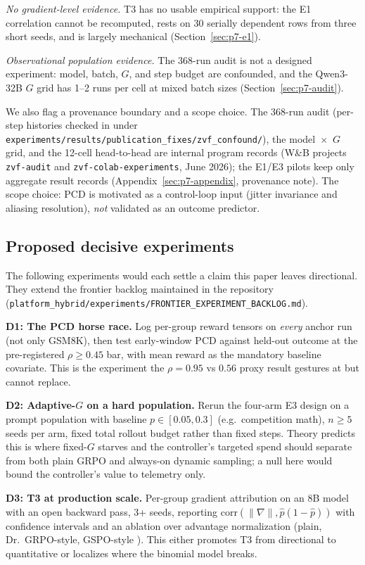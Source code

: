 \emph{No gradient-level evidence.} T3 has no usable empirical support: the
E1 correlation cannot be recomputed, rests on 30 serially dependent rows from
three short seeds, and is largely mechanical (Section~\ref{sec:p7-e1}).

\emph{Observational population evidence.} The 368-run audit is not a designed
experiment: model, batch, $G$, and step budget are confounded, and the
Qwen3-32B $G$ grid has 1--2 runs per cell at mixed batch sizes
(Section~\ref{sec:p7-audit}).

We also flag a provenance boundary and a scope choice. The 368-run audit
(per-step histories checked in under
\texttt{experiments/results/publication\_fixes/zvf\_confound/}), the
model~$\times$~$G$ grid, and the 12-cell head-to-head are internal program
records (W\&B projects \texttt{zvf-audit} and
\texttt{zvf-colab-experiments}, June 2026); the E1/E3 pilots keep
only aggregate result records (Appendix~\ref{sec:p7-appendix}, provenance
note). The scope choice: PCD is motivated as a control-loop input (jitter
invariance and aliasing resolution), \emph{not} validated as an outcome
predictor.

\subsection{Proposed decisive experiments}
\label{sec:p7-proposed}
The following experiments would each settle a claim this paper leaves
directional. They extend the frontier backlog maintained in the repository
(\texttt{platform_hybrid/experiments/FRONTIER\_EXPERIMENT\_BACKLOG.md}).

\textbf{D1: The PCD horse race.} Log per-group reward tensors on
\emph{every} anchor run (not only GSM8K), then test early-window PCD
against held-out outcome at the pre-registered $\rho \geq 0.45$ bar, with
mean reward as the mandatory baseline covariate. This is the experiment the
$\rho = 0.95$ vs $0.56$ proxy result gestures at but cannot replace.

\textbf{D2: Adaptive-$G$ on a hard population.} Rerun the four-arm E3
design on a prompt population with baseline $p \in [0.05, 0.3]$ (e.g.\
competition math), $n \geq 5$ seeds per arm, fixed total rollout budget
rather than fixed steps. Theory predicts this is where fixed-$G$ starves
and the controller's targeted spend should separate from both plain GRPO
and always-on dynamic sampling; a null here would bound the controller's
value to telemetry only.

\textbf{D3: T3 at production scale.} Per-group gradient attribution on an
8B model with an open backward pass, 3+ seeds, reporting
$\mathrm{corr}(\|\nabla\|, \hat p(1-\hat p))$ with confidence intervals and
an ablation over advantage normalization (plain, Dr.~GRPO-style, GSPO-style
\citep{qwen2025gspo}). This either promotes T3 from directional to
quantitative or localizes where the binomial model breaks.

